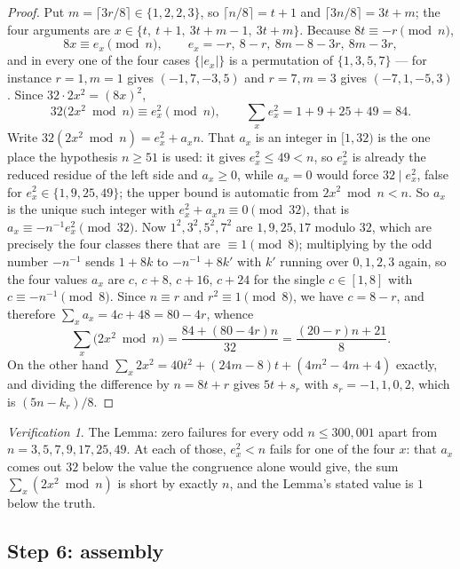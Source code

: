 \documentclass[11pt,reqno]{amsart}
\theoremstyle{plain}
\theoremstyle{remark}
\newtheorem*{verification}{Verification}
\numberwithin{equation}{section}
\begin{document}
\begin{proof}
Put $m = \lceil 3r/8\rceil \in \{1,2,2,3\}$, so $\lceil n/8\rceil = t+1$ and
$\lceil 3n/8\rceil = 3t+m$; the four arguments are
$x \in \{t,\ t+1,\ 3t+m-1,\ 3t+m\}$. Because $8t \equiv -r \pmod n$,
\[
  8x \equiv e_x \pmod n, \qquad e_x = -r,\ 8-r,\ 8m-8-3r,\ 8m-3r,
\]
and in every one of the four cases $\{|e_x|\}$ is a permutation of
$\{1,3,5,7\}$ --- for instance $r=1,m=1$ gives $(-1,7,-3,5)$ and $r=7,m=3$ gives
$(-7,1,-5,3)$. Since $32 \cdot 2x^2 = (8x)^2$,
\[
  32\bigl(2x^2 \bmod n\bigr) \equiv e_x^2 \pmod n,
  \qquad \sum_x e_x^2 = 1+9+25+49 = 84 .
\]
Write $32(2x^2 \bmod n) = e_x^2 + a_x n$. That $a_x$ is an integer in $[1,32)$
is the one place the hypothesis $n \ge 51$ is used: it gives
$e_x^2 \le 49 < n$, so $e_x^2$ is already the reduced residue of the left side
and $a_x \ge 0$, while $a_x = 0$ would force $32 \mid e_x^2$, false for
$e_x^2 \in \{1,9,25,49\}$; the upper bound is automatic from
$2x^2 \bmod n < n$. So $a_x$ is the unique such integer with
$e_x^2 + a_x n \equiv 0 \pmod{32}$, that is $a_x \equiv -n^{-1}e_x^2 \pmod{32}$.
Now $1^2,3^2,5^2,7^2$ are $1,9,25,17$ modulo $32$, which are precisely the four
classes there that are $\equiv 1 \pmod 8$; multiplying by the odd number
$-n^{-1}$ sends $1+8k$ to $-n^{-1}+8k'$ with $k'$ running over $0,1,2,3$ again,
so the four values $a_x$ are $c,\,c+8,\,c+16,\,c+24$ for the single
$c \in [1,8]$ with $c \equiv -n^{-1} \pmod 8$. Since $n \equiv r$ and
$r^2 \equiv 1 \pmod 8$, we have $c = 8-r$, and therefore
$\sum_x a_x = 4c+48 = 80-4r$, whence
\[
  \sum_x \bigl(2x^2 \bmod n\bigr) = \frac{84+(80-4r)n}{32}
  = \frac{(20-r)n+21}{8}.
\]
On the other hand $\sum_x 2x^2 = 40t^2+(24m-8)t+(4m^2-4m+4)$ exactly, and
dividing the difference by $n = 8t+r$ gives $5t+s_r$ with
$s_r = -1,1,0,2$, which is $(5n-k_r)/8$.
\end{proof}

\begin{verification}
The Lemma: zero failures for every odd $n \le 300{,}001$ apart from
$n = 3,5,7,9,17,25,49$. At each of those, $e_x^2 < n$ fails for one of the four
$x$: that $a_x$ comes out $32$ below the value the congruence alone would give,
the sum $\sum_x (2x^2 \bmod n)$ is short by exactly $n$, and the Lemma's stated
value is $1$ below the truth.
\end{verification}

\subsection{Step 6: assembly}
\end{document}
